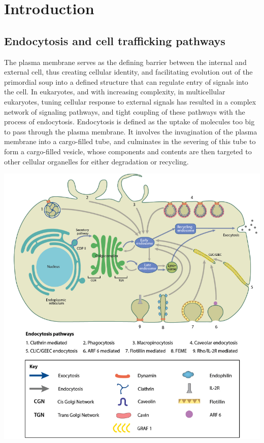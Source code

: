 \chapter{Introduction} %
\graphicspath{ {/Users/kaksonenlab/Desktop/figures/} }
\label{Ch:Aims} %

\section{Endocytosis and cell trafficking pathways}
The plasma membrane serves as the defining barrier between the internal and external cell, thus creating cellular identity, and facilitating evolution out of the primordial soup into a defined structure that can regulate entry of signals into the cell. In eukaryotes, and with increasing complexity, in multicellular eukaryotes, tuning cellular response to external signals has resulted in a complex network of signaling pathways, and tight coupling of these pathways with the process of endocytosis. Endocytosis is defined as the uptake of molecules too big to pass through the plasma membrane. It involves the invagination of the plasma membrane into a cargo-filled tube, and culminates in the severing of this tube to form a cargo-filled vesicle, whose components and contents are then targeted to other cellular organelles for either degradation or recycling. 


\includegraphics[scale=0.39]{figures/intro/fig1_screenshot}
\vspace{5mm}

